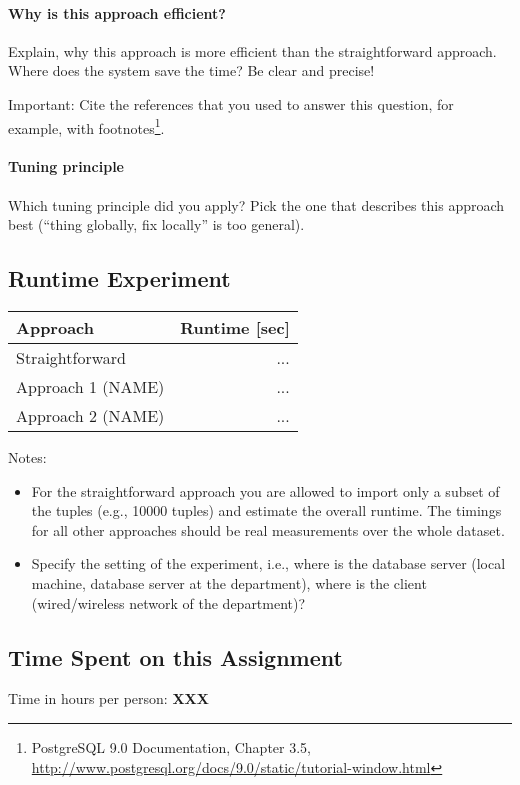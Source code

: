 \documentclass[11pt]{scrartcl}
\begin{document}
  \paragraph{Why is this approach efficient?}

  Explain, why this approach is more efficient than the
  straightforward approach. Where does the system save the time? Be
  clear and precise!

  Important: Cite the references that you used to answer this
  question, for example, with footnotes\footnote{PostgreSQL 9.0
    Documentation, Chapter 3.5,
    \url{http://www.postgresql.org/docs/9.0/static/tutorial-window.html}}.

  \paragraph{Tuning principle}

  Which tuning principle did you apply? Pick the one that describes
  this approach best (``thing globally, fix locally'' is too general).

  \subsection*{Runtime Experiment}

  \begin{table}[H]
  \begin{tabular}{l|r}
    Approach & Runtime [sec] \\
    \hline
    Straightforward & ... \\
    Approach 1 (NAME) & ... \\
    Approach 2 (NAME) & ...
  \end{tabular}
  \end{table}

  \bigskip

  \noindent Notes:
  \begin{itemize}
  \item For the straightforward approach you are allowed to import
    only a subset of the tuples (e.g., 10000 tuples) and estimate the
    overall runtime. The timings for all other approaches should be
    real measurements over the whole dataset.
  \item Specify the setting of the experiment, i.e., where is the
    database server (local machine, database server at the
    department), where is the client (wired/wireless network of the
    department)?
\end{itemize}

  \subsection*{Time Spent on this Assignment}

  Time in hours per person: {\bf XXX}
\end{document}
